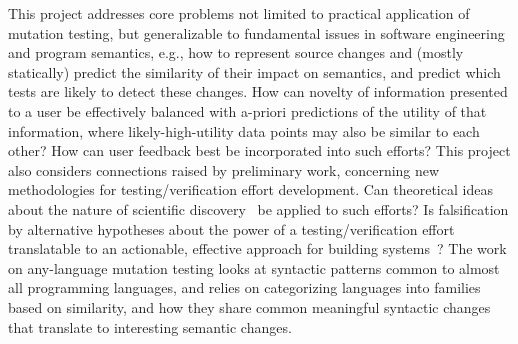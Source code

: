This project addresses core problems not limited to practical application of mutation testing, but generalizable to fundamental issues in software engineering and program semantics, e.g., how to represent source changes and (mostly statically) predict the similarity of their impact on semantics, and predict which tests are likely to detect these changes.  How can novelty of information presented to a user be effectively balanced with a-priori predictions of the utility of that information, where likely-high-utility data points may also be similar to each other?  How can user feedback best be incorporated into such efforts?  This project also considers connections raised by preliminary work, concerning new methodologies for testing/verification effort development.  Can theoretical ideas about the nature of scientific discovery~\cite{Popper,popperconjectures,lakatos} be applied to such efforts?  Is falsification by alternative hypotheses about the power of a testing/verification effort translatable to an actionable, effective approach for building systems~\cite{groce2015verified,groce2018verified}? 
The work on any-language mutation testing looks at syntactic patterns common to almost all programming languages, and relies on categorizing languages into families based on similarity, and how they share common meaningful syntactic changes that translate to interesting semantic changes.  
